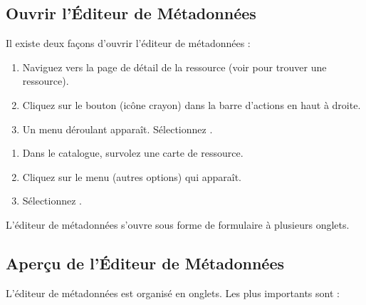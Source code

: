 \documentclass[letterpaper,10pt,english]{sphinxmanual}
\begin{document}
\subsection{Ouvrir l’Éditeur de Métadonnées}
\label{\detokenize{fr/03_gerer_metadonnees:ouvrir-l-editeur-de-metadonnees}}
\sphinxAtStartPar
Il existe deux façons d’ouvrir l’éditeur de métadonnées :

\sphinxAtStartPar
{}
\begin{enumerate}
%
\item {} 
\sphinxAtStartPar
Naviguez vers la page de détail de la ressource (voir {\hyperref[\detokenize{fr/02_trouver_visualiser:find-fr}]{}} pour trouver
une ressource).

\item {} 
\sphinxAtStartPar
Cliquez sur le bouton  (icône crayon) dans la barre d’actions en haut à
droite.

\item {} 
\sphinxAtStartPar
Un menu déroulant apparaît. Sélectionnez .

\end{enumerate}

\sphinxAtStartPar
{}
\begin{enumerate}
%
\item {} 
\sphinxAtStartPar
Dans le catalogue, survolez une carte de ressource.

\item {} 
\sphinxAtStartPar
Cliquez sur le menu  (autres options) qui apparaît.

\item {} 
\sphinxAtStartPar
Sélectionnez .

\end{enumerate}

\sphinxAtStartPar
L’éditeur de métadonnées s’ouvre sous forme de formulaire à plusieurs onglets.


\subsection{Aperçu de l’Éditeur de Métadonnées}
\label{\detokenize{fr/03_gerer_metadonnees:apercu-de-l-editeur-de-metadonnees}}
\sphinxAtStartPar
L’éditeur de métadonnées est organisé en onglets. Les plus importants sont :
\end{document}

